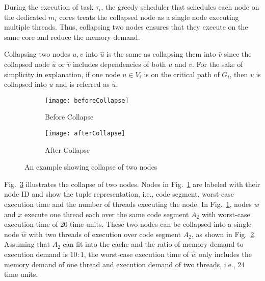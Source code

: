 During the execution of task $\tau_i$, the greedy scheduler that schedules each node on the dedicated $m_i$ cores treats the collapsed node as a single node executing multiple threads. Thus, collapsing two nodes ensures that they execute on the same core and reduce the memory demand. 

Collapsing two nodes $u, v$ into $\hat{u}$ is the same as collapsing them into $\hat{v}$ since the collapsed node $\hat{u}$ or $\hat{v}$ includes dependencies of both $u$ and $v$. For the sake of simplicity in explanation, if one node $u \in V_i$ is on the critical path of $G_i$, then $v$ is collapsed into $u$ and is referred as $\hat{u}$.





\begin{figure}
  \centering
  \begin{subfigure}[b]{0.4\textwidth}{
      \texttt{[image: beforeCollapse]}
      \caption{Before Collapse}
      \label{fig:before-collapse}
    }
  \end{subfigure} \quad
  \begin{subfigure}[b]{0.4\textwidth}{
      \texttt{[image: afterCollapse]}
      \caption{After Collapse}
      \label{fig:after-collapse}
    }
  \end{subfigure}
  \caption{An example showing collapse of two nodes}
  \label{fig:dag-collapse}
\end{figure}

Fig.~\ref{fig:dag-collapse} illustrates the collapse of two nodes. Nodes in
Fig.~\ref{fig:before-collapse} are labeled with their node ID and show the tuple representation, i.e., code segment, worst-case execution time and the number of threads executing the node. In Fig.~\ref{fig:before-collapse}, nodes $w$ and $x$ execute one thread each over the same code segment $A_2$ with worst-case execution time of 20 time units. These two nodes can be collapsed into a single node $\hat{w}$ with two threads of execution over code segment $A_2$,  as shown in Fig.~\ref{fig:after-collapse}. Assuming that $A_2$ can fit into the cache and the ratio of memory demand to execution demand is $10:1$, the worst-case execution time of $\hat{w}$ only includes the memory demand of one thread and execution demand of two threads, i.e., $24$ time units.






